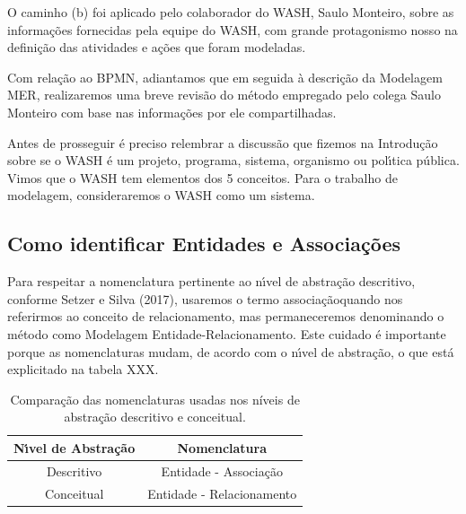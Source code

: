 \documentclass[
12pt,		%
openright,	%
twoside,  %
a4paper,			%
chapter=TITLE,		%
english,			%
french,				%
spanish,			%
brazil				%
]{USPSC-classe/USPSC}
\begin{document}
O caminho (b) foi aplicado pelo colaborador do WASH, Saulo Monteiro, sobre as informa\c{c}\~oes fornecidas pela equipe do WASH, com grande protagonismo nosso na defini\c{c}\~ao das atividades e a\c{c}\~oes que foram modeladas.




Com rela\c{c}\~ao ao BPMN, adiantamos que em seguida \`a descri\c{c}\~ao da Modelagem MER, realizaremos uma breve revis\~ao do m\'etodo empregado pelo colega Saulo Monteiro com base nas informa\c{c}\~oes por ele compartilhadas.




Antes de prosseguir \'e preciso relembrar a discuss\~ao que fizemos na Introdu\c{c}\~ao sobre se o WASH \'e um projeto, programa, sistema, organismo ou pol\'{\i}tica p\'ublica. Vimos que o WASH tem elementos dos 5 conceitos. Para o trabalho de modelagem, consideraremos o WASH como um sistema.




\subsection[Como identificar Entidades e Associa\c{c}\~oes]{Como identificar Entidades e Associa\c{c}\~oes}\label{Como identificar Entidades e Associa\c{c}\~oes}
Para respeitar a nomenclatura pertinente ao n\'{\i}vel de abstra\c{c}\~ao descritivo, conforme  Setzer e Silva (2017), usaremos o termo \textquotedbl associa\c{c}\~ao\textquotedbl  quando nos referirmos ao conceito de \textquotedbl relacionamento\textquotedbl , mas permaneceremos denominando o m\'etodo como \textquotedbl Modelagem Entidade-Relacionamento\textquotedbl . Este cuidado \'e importante porque as nomenclaturas mudam, de acordo com o n\'{\i}vel de abstra\c{c}\~ao, o que est\'a explicitado na tabela XXX.








\begin{table}[htb]
\tiny
\caption{\label{89529551198bad4d68f6da15b612c6b28f6bdd01}Compara\c{c}\~ao das nomenclaturas usadas nos n\'{i}veis de abstra\c{c}\~ao descritivo e conceitual.}

\centering
\begin{tabular}{|c|c|}
\hline
N\'{\i}vel de Abstra\c{c}\~ao  &  Nomenclatura \\
\hline
Descritivo  &  Entidade - Associa\c{c}\~ao \\
Conceitual  &  Entidade - Relacionamento \\
\hline
\end{tabular}
\end{table}
\end{document}
